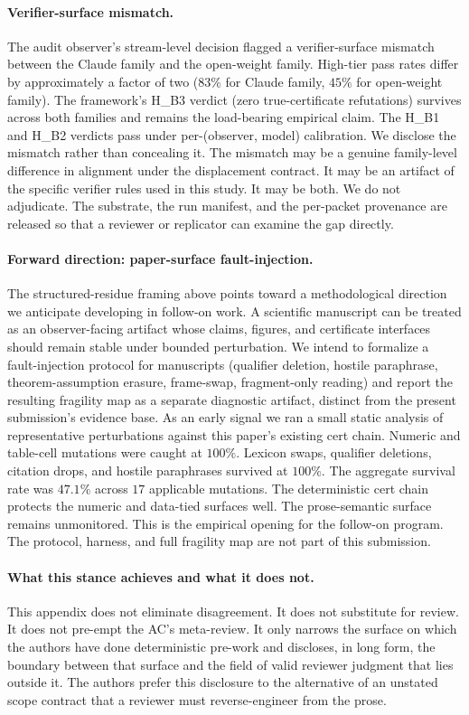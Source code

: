 \paragraph{Verifier-surface mismatch.}
The audit observer's stream-level decision flagged a verifier-surface mismatch between the Claude family and the open-weight family. High-tier pass rates differ by approximately a factor of two ($83\%$ for Claude family, $45\%$ for open-weight family). The framework's H\_B3 verdict (zero true-certificate refutations) survives across both families and remains the load-bearing empirical claim. The H\_B1 and H\_B2 verdicts pass under per-(observer, model) calibration. We disclose the mismatch rather than concealing it. The mismatch may be a genuine family-level difference in alignment under the displacement contract. It may be an artifact of the specific verifier rules used in this study. It may be both. We do not adjudicate. The substrate, the run manifest, and the per-packet provenance are released so that a reviewer or replicator can examine the gap directly.

\paragraph{Forward direction: paper-surface fault-injection.}
The structured-residue framing above points toward a methodological direction we anticipate developing in follow-on work. A scientific manuscript can be treated as an observer-facing artifact whose claims, figures, and certificate interfaces should remain stable under bounded perturbation. We intend to formalize a fault-injection protocol for manuscripts (qualifier deletion, hostile paraphrase, theorem-assumption erasure, frame-swap, fragment-only reading) and report the resulting fragility map as a separate diagnostic artifact, distinct from the present submission's evidence base. As an early signal we ran a small static analysis of representative perturbations against this paper's existing cert chain. Numeric and table-cell mutations were caught at $100\%$. Lexicon swaps, qualifier deletions, citation drops, and hostile paraphrases survived at $100\%$. The aggregate survival rate was $47.1\%$ across $17$ applicable mutations. The deterministic cert chain protects the numeric and data-tied surfaces well. The prose-semantic surface remains unmonitored. This is the empirical opening for the follow-on program. The protocol, harness, and full fragility map are not part of this submission.

\paragraph{What this stance achieves and what it does not.}
This appendix does not eliminate disagreement. It does not substitute for review. It does not pre-empt the AC's meta-review. It only narrows the surface on which the authors have done deterministic pre-work and discloses, in long form, the boundary between that surface and the field of valid reviewer judgment that lies outside it. The authors prefer this disclosure to the alternative of an unstated scope contract that a reviewer must reverse-engineer from the prose.
